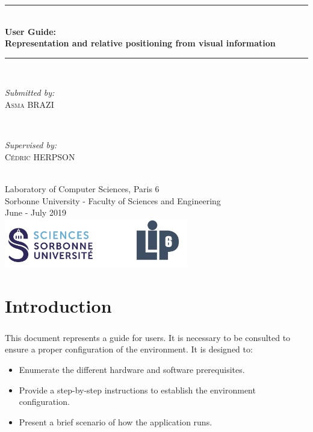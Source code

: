 \documentclass[12pt]{report}
\begin{document}
\begin{titlepage}

\newcommand{\HRule}{\rule{\linewidth}{0.5mm}} %

\center 
\HRule \\[0.4cm]
{ \huge \bfseries User Guide: \\Representation and relative positioning from visual information}\\[0.4cm]
\HRule \\[1.5cm]

\begin{minipage}{0.4\textwidth}
	\begin{flushleft} \large
		\emph{Submitted by:}\\
		\textsc{Asma BRAZI}
	\end{flushleft}
\end{minipage}
~
\begin{minipage}{0.4\textwidth}
	\begin{flushright} \large
		\emph{Supervised by:} \\
		\textsc{Cédric HERPSON}\\
	\end{flushright}
\end{minipage}\\[4cm]


{\large Laboratory of Computer Sciences, Paris 6 \\ Sorbonne University - Faculty of Sciences and Engineering}\\[3cm] 
{\large June - July 2019 }\\[3cm] 
\includegraphics[width=0.6\textwidth]{res/logo.png}\\[1cm] 
\vfill %

\end{titlepage}
\tableofcontents
\chapter{Introduction}
\paragraph{}
This document represents a guide for users. It is necessary to be consulted to ensure a proper configuration of the environment. It is designed to:
\begin{itemize}
    \item Enumerate the different hardware and software prerequisites.
    \item Provide a step-by-step instructions to establish the environment configuration.
    \item Present a brief scenario of how the application runs.
\end{itemize}
\end{document}
